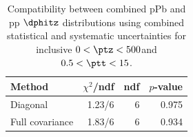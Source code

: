 \begin{table}[htp!]
\centering
\begin{tabular}{|l|r|r|r|}
\hline
Method & $\chi^2$/ndf & ndf & $p$-value \\
\hline
Diagonal & 1.23/6 & 6 & 0.975 \\
Full covariance & 1.83/6 & 6 & 0.934 \\
\hline
\end{tabular}
\caption{Compatibility between combined pPb and pp $\dphitz$ distributions using combined statistical and systematic uncertainties for inclusive $0 < \ptz < 500$\GeV and $0.5 < \ptt < 15$\GeV.}
\label{table:chisq_dphi}
\end{table}
